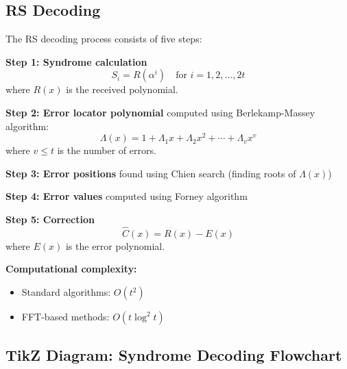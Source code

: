 \subsection{RS Decoding}

The RS decoding process consists of five steps:

\textbf{Step 1: Syndrome calculation}
\begin{equation}
S_i = R(\alpha^i) \quad \text{for } i = 1, 2, \ldots, 2t
\end{equation}
where $R(x)$ is the received polynomial.

\textbf{Step 2: Error locator polynomial} computed using Berlekamp-Massey algorithm:
\begin{equation}
\Lambda(x) = 1 + \Lambda_1 x + \Lambda_2 x^2 + \cdots + \Lambda_v x^v
\end{equation}
where $v \leq t$ is the number of errors.

\textbf{Step 3: Error positions} found using Chien search (finding roots of $\Lambda(x)$)

\textbf{Step 4: Error values} computed using Forney algorithm

\textbf{Step 5: Correction}
\begin{equation}
\hat{C}(x) = R(x) - E(x)
\end{equation}
where $E(x)$ is the error polynomial.

\textbf{Computational complexity:}
\begin{itemize}
\item Standard algorithms: $O(t^2)$
\item FFT-based methods: $O(t \log^2 t)$
\end{itemize}

\subsection{TikZ Diagram: Syndrome Decoding Flowchart}

